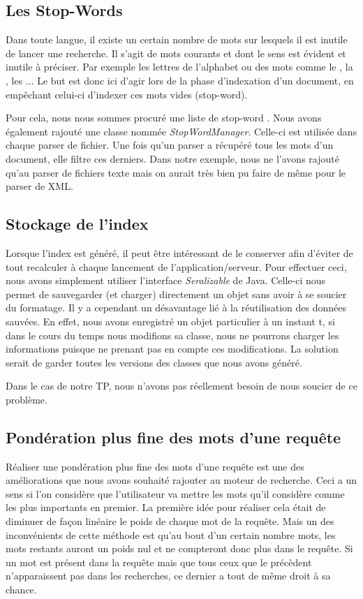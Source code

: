\documentclass[a4paper,12pt]{article}
\begin{document}
\subsection{Les Stop-Words}

Dans toute langue, il existe un certain nombre de \og mots \fg{} sur lesquels il est inutile de lancer une recherche. Il s'agit de mots courants et dont le sens est évident et inutile à préciser. Par exemple les lettres de l'alphabet ou des mots comme \og le \fg{}, \og la \fg{}, \og les \fg{} ... Le but est donc ici d'agir lors de la phase d'indexation d'un document, en empêchant celui-ci d'indexer ces \og mots vides \fg{} (stop-word).

Pour cela, nous nous sommes procuré une liste de \og stop-word \fg{}. Nous avons également rajouté une classe nommée \textit{StopWordManager}. Celle-ci est utilisée dans chaque parser de fichier. Une fois qu'un parser a récupéré tous les mots d'un document, elle filtre ces derniers. Dans notre exemple, nous ne l'avons rajouté qu'au parser de fichiers texte mais on aurait très bien pu faire de même pour le parser de XML.

\subsection{Stockage de l'index}

Lorsque l'index est généré, il peut être intéressant de le conserver afin d'éviter de tout recalculer à chaque lancement de l'application/serveur. Pour effectuer ceci, nous avons simplement utiliser l'interface \textit{Seralizable} de Java. Celle-ci nous permet de sauvegarder (et charger) directement un objet sans avoir à se soucier du formatage. Il y a cependant un désavantage lié à la réutilisation des données sauvées. En effet, nous avons enregistré un objet particulier à un instant t, si dans le cours du temps nous modifions sa classe, nous ne pourrons charger les informations puisque ne prenant pas en compte ces modifications. La solution serait de garder toutes les versions des classes que nous avons généré.

Dans le cas de notre TP, nous n'avons pas réellement besoin de nous soucier de ce problème.

\subsection{Pondération plus fine des mots d'une requête}

Réaliser une pondération plus fine des mots d'une requête est une des améliorations que nous avons souhaité rajouter au moteur de recherche. Ceci a un sens si l'on
considère que l'utilisateur va mettre les mots qu'il considère comme les plus importants en premier. La première idée pour réaliser cela était de diminuer de façon linéaire le poids de chaque mot de la requête.
Mais un des inconvénients de cette méthode est qu'au bout d'un certain nombre mots, les mots restants auront un poids nul et ne compteront donc plus dans le requête. Si un mot est présent dans la requête mais que tous ceux que le précèdent n'apparaissent pas dans les recherches, ce dernier a tout de même droit à sa chance.
\end{document}
